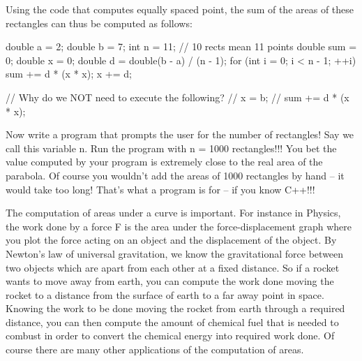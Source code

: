 Using the code that computes equally spaced point, the sum of the areas
of these rectangles can thus be computed as follows:
\begin{console}
double a = 2;
double b = 7;
int n = 11; // 10 rects mean 11 points
double sum = 0;
double x = 0;
double d = double(b - a) / (n - 1);
for (int i = 0; i < n - 1; ++i)
{   
    sum += d * (x * x);
    x += d;
}

// Why do we NOT need to execute the following?
// x = b;
// sum += d * (x * x);
\end{console}

Now write a program that prompts the user for the number of rectangles!
Say we call this variable n. Run the program with n = 1000 rectangles!!!
You bet the value computed by your program is extremely close to the
real area of the parabola. Of course you wouldn't add
the areas of 1000 rectangles by hand -- it would take too long!
That's what a program is for -- if you know C++!!!





The computation of areas under a curve is important. For instance in
Physics, the work done by a force F is the area under the
force-displacement graph where you plot the force acting on an object
and the displacement of the object. By Newton's law of
universal gravitation, we know the gravitational force between two
objects which are apart from each other at a fixed distance. So if a
rocket wants to move away from earth, you can compute the work done
moving the rocket to a distance from the surface of earth to a far away
point in space. Knowing the work to be done moving the rocket from earth
through a required distance, you can then compute the amount of chemical
fuel that is needed to combust in order to convert the chemical energy
into required work done. Of course there are many other applications of
the computation of areas.

